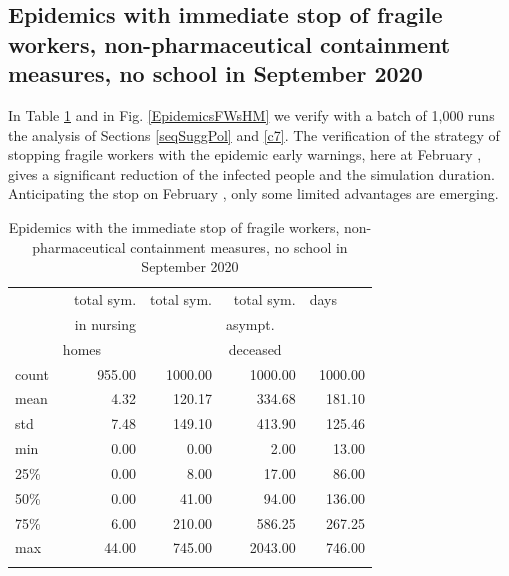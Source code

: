 \documentclass[graybox]{svmult}
\begin{document}
\subsection{Epidemics with immediate stop of fragile workers, non-pharmaceutical containment measures, no school in September 2020}
\label{EpidemicsFWsS}


In Table \ref{EpidemicsFWsT} and in Fig. \ref{EpidemicsFWsHM} we verify with a batch of 1,000 runs the analysis of Sections \ref{seqSuggPol} and \ref{c7}. The verification of the strategy of stopping fragile workers with the epidemic early warnings, here at February , gives a significant reduction of the infected people and the simulation duration. Anticipating the stop on February , only some limited advantages are emerging.

\begin{table}[t]
\center
\small
\begin{tabular}{lrrrr}
\hline\noalign{\smallskip}
{} & total sym.        &  total sym. & total sym.     & days~~~~ \\
{} & in nursing        &                  & asympt.~~~  & \\
{} & homes~~~~~  &                  & deceased~~ & \\
\noalign{\smallskip}\svhline\noalign{\smallskip}
count &     955.00 &             1000.00 &                 1000.00 & 1000.00 \\
mean  &       4.32 &              120.17 &                  334.68 &  181.10 \\
std   &       7.48 &              149.10 &                  413.90 &  125.46 \\
min   &       0.00 &                0.00 &                    2.00 &   13.00 \\
25\%   &       0.00 &                8.00 &                   17.00 &   86.00 \\
50\%   &       0.00 &               41.00 &                   94.00 &  136.00 \\
75\%   &       6.00 &              210.00 &                  586.25 &  267.25 \\
max   &      44.00 &              745.00 &                 2043.00 &  746.00 \\
\hline\noalign{\smallskip}
\end{tabular}

\label{EpidemicsFWsT}
\caption{Epidemics with the immediate stop of fragile workers, non-pharmaceutical containment measures, no school in September 2020}
\end{table}
\end{document}
